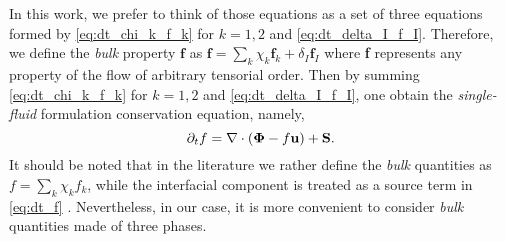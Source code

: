 In this work, we prefer to think of those equations as a set of three equations formed by \ref{eq:dt_chi_k_f_k} for $k=1,2$ and \ref{eq:dt_delta_I_f_I}. 
Therefore, we define the \textit{bulk} property $\textbf{f}$ as $\textbf{f} = \sum_k \chi_k \textbf{f}_k + \delta_I \textbf{f}_I$ where \textbf{f} represents any property of the flow of arbitrary tensorial order.
Then by summing \ref{eq:dt_chi_k_f_k} for $k=1,2$ and \ref{eq:dt_delta_I_f_I}, one obtain the \textit{single-fluid} formulation conservation equation, namely,
\begin{equation}
    \partial_t f
    = \mathbf{\nabla} \cdot (\mathbf{\Phi} - f \textbf{u})
    + \textbf{S}. 
    \label{eq:dt_f}
\end{equation}
It should be noted that in the literature we rather define the \textit{bulk} quantities as $f = \sum_k \chi_k f_k$, while the interfacial component is treated as a source term in \ref{eq:dt_f} \citep{morel2015mathematical,tryggvason2011direct,drew1983mathematical}. 
Nevertheless, in our case, it is more convenient to consider \textit{bulk} quantities made of three phases. 
